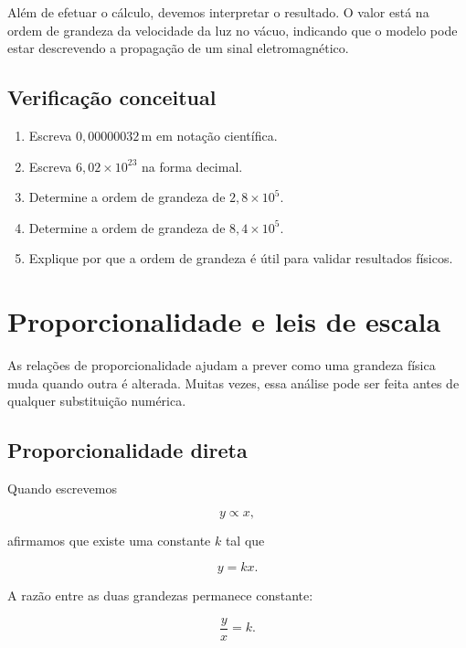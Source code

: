 Além de efetuar o cálculo, devemos interpretar o resultado. O valor está na ordem de grandeza da velocidade da luz no vácuo, indicando que o modelo pode estar descrevendo a propagação de um sinal eletromagnético.

\subsection*{Verificação conceitual}

\begin{enumerate}
  \item Escreva $0{,}00000032\,\si{\meter}$ em notação científica.
  \item Escreva $6{,}02\times10^{23}$ na forma decimal.
  \item Determine a ordem de grandeza de $2{,}8\times10^5$.
  \item Determine a ordem de grandeza de $8{,}4\times10^5$.
  \item Explique por que a ordem de grandeza é útil para validar resultados físicos.
\end{enumerate}

\section{Proporcionalidade e leis de escala}

As relações de proporcionalidade ajudam a prever como uma grandeza física muda quando outra é alterada. Muitas vezes, essa análise pode ser feita antes de qualquer substituição numérica.

\subsection{Proporcionalidade direta}

Quando escrevemos

\begin{equation}
  y\propto x,
\end{equation}

afirmamos que existe uma constante $k$ tal que

\begin{equation}
  y=kx.
\end{equation}

A razão entre as duas grandezas permanece constante:

\begin{equation}
  \frac{y}{x}=k.
\end{equation}

